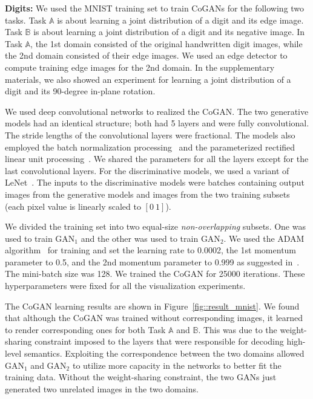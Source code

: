 {\bf Digits:} We used the MNIST training set to train CoGANs for the following two tasks. Task $\mathbb{A}$ is about learning a joint distribution of a digit and its edge image. Task $\mathbb{B}$ is about learning a joint distribution of a digit and its negative image. In Task $\mathbb{A}$, the 1st domain consisted of the original handwritten digit images, while the 2nd domain consisted of their edge images. We used an edge detector to compute training edge images for the 2nd domain. In the supplementary materials, we also showed an experiment for learning a joint distribution of a digit and its 90-degree in-plane rotation.

We used deep convolutional networks to realized the CoGAN. The two generative models had an identical structure; both had 5 layers and were fully convolutional. The stride lengths of the convolutional layers were fractional. The models also employed the batch normalization processing~\cite{ioffe2015batch} and the parameterized rectified linear unit processing~\cite{he2015delving}. We shared the parameters for all the layers except for the last convolutional layers. For the discriminative models, we used a variant of LeNet~\cite{lecun1998gradient}. The inputs to the discriminative models were batches containing output images from the generative models and images from the two training subsets (each pixel value is linearly scaled to $[0\medspace1]$). 

We divided the training set into two equal-size {\it non-overlapping} subsets. One was used to train $\text{GAN}_1$ and the other was used to train $\text{GAN}_2$. We used the ADAM algorithm~\cite{kingma2014adam} for training and set the learning rate to 0.0002, the 1st momentum parameter to 0.5, and the 2nd momentum parameter to 0.999 as suggested in~\cite{radford2015unsupervised}. The mini-batch size was 128. We trained the CoGAN for 25000 iterations. These hyperparameters were fixed for all the visualization experiments. 

The CoGAN learning results are shown in Figure~\ref{fig::result_mnist}. We found that although the CoGAN was trained without corresponding images, it learned to render corresponding ones for both Task $\mathbb{A}$ and $\mathbb{B}$. This was due to the weight-sharing constraint imposed to the layers that were responsible for decoding high-level semantics. Exploiting the correspondence between the two domains allowed $\text{GAN}_1$ and $\text{GAN}_2$ to utilize more capacity in the networks to better fit the training data. Without the weight-sharing constraint, the two GANs just generated two unrelated images in the two domains.

